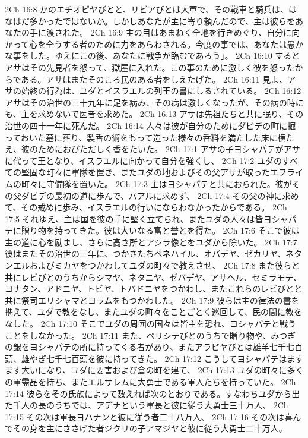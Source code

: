 2Ch 16:8  かのエチオピヤびとと、リビアびとは大軍で、その戦車と騎兵は、はなはだ多かったではないか。しかしあなたが主に寄り頼んだので、主は彼らをあなたの手に渡された。
2Ch 16:9  主の目はあまねく全地を行きめぐり、自分に向かって心を全うする者のために力をあらわされる。今度の事では、あなたは愚かな事をした。ゆえにこの後、あなたに戦争が臨むであろう」。
2Ch 16:10  するとアサはその先見者を怒って、獄屋に入れた。この事のために激しく彼を怒ったからである。アサはまたそのころ民のある者をしえたげた。
2Ch 16:11  見よ、アサの始終の行為は、ユダとイスラエルの列王の書にしるされている。
2Ch 16:12  アサはその治世の三十九年に足を病み、その病は激しくなったが、その病の時にも、主を求めないで医者を求めた。
2Ch 16:13  アサは先祖たちと共に眠り、その治世の四十一年に死んだ。
2Ch 16:14  人々は彼が自分のためにダビデの町に掘っておいた墓に葬り、製香の術をもって造った様々の香料を満たした床に横たえ、彼のためにおびただしく香をたいた。
2Ch 17:1  アサの子ヨシャパテがアサに代って王となり、イスラエルに向かって自分を強くし、
2Ch 17:2  ユダのすべての堅固な町々に軍隊を置き、またユダの地およびその父アサが取ったエフライムの町々に守備隊を置いた。
2Ch 17:3  主はヨシャパテと共におられた。彼がその父ダビデの最初の道に歩んで、バアルに求めず、
2Ch 17:4  その父の神に求めて、その戒めに歩み、イスラエルの行いにならわなかったからである。
2Ch 17:5  それゆえ、主は国を彼の手に堅く立てられ、またユダの人々は皆ヨシャパテに贈り物を持ってきた。彼は大いなる富と誉とを得た。
2Ch 17:6  そこで彼は主の道に心を励まし、さらに高き所とアシラ像とをユダから除いた。
2Ch 17:7  彼はまたその治世の三年に、つかさたちベネハイル、オバデヤ、ゼカリヤ、ネタンエルおよびミカヤをつかわしてユダの町々で教えさせ、
2Ch 17:8  また彼らと共にレビびとのうちからシマヤ、ネタニヤ、ゼバデヤ、アサヘル、セミラモテ、ヨナタン、アドニヤ、トビヤ、トバドニヤをつかわし、またこれらのレビびとと共に祭司エリシャマとヨラムをもつかわした。
2Ch 17:9  彼らは主の律法の書を携えて、ユダで教をなし、またユダの町々をことごとく巡回して、民の間に教をなした。
2Ch 17:10  そこでユダの周囲の国々は皆主を恐れ、ヨシャパテと戦うことをしなかった。
2Ch 17:11  また、ペリシテびとのうちで贈り物や、みつぎの銀をヨシャパテの所に持ってくる者があり、またアラビヤびとは雄羊七千七百頭、雄やぎ七千七百頭を彼に持ってきた。
2Ch 17:12  こうしてヨシャパテはますます大いになり、ユダに要害および倉の町を建て、
2Ch 17:13  ユダの町々に多くの軍需品を持ち、またエルサレムに大勇士である軍人たちを持っていた。
2Ch 17:14  彼らをその氏族によって数えれば次のとおりである。すなわちユダから出た千人の長のうちでは、アデナという軍長と彼に従う大勇士三十万人、
2Ch 17:15  その次は軍長ヨハナンと彼に従う者二十八万人、
2Ch 17:16  その次は喜んでその身を主にささげた者ジクリの子アマジヤと彼に従う大勇士二十万人。

